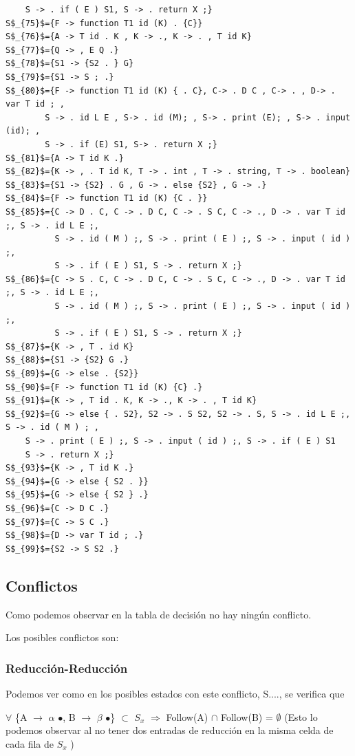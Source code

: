 \documentclass[a4paper, 12pt]{article}
\begin{document}
\begin{lstlisting}
	S -> . if ( E ) S1, S -> . return X ;}
S$_{75}$={F -> function T1 id (K) . {C}}
S$_{76}$={A -> T id . K , K -> ., K -> . , T id K}
S$_{77}$={Q -> , E Q .}
S$_{78}$={S1 -> {S2 . } G}
S$_{79}$={S1 -> S ; .}
S$_{80}$={F -> function T1 id (K) { . C}, C-> . D C , C-> . , D-> . var T id ; ,
        S -> . id L E , S-> . id (M); , S-> . print (E); , S-> . input (id); , 
        S -> . if (E) S1, S-> . return X ;}
S$_{81}$={A -> T id K .}
S$_{82}$={K -> , . T id K, T -> . int , T -> . string, T -> . boolean}
S$_{83}$={S1 -> {S2} . G , G -> . else {S2} , G -> .}
S$_{84}$={F -> function T1 id (K) {C . }}
S$_{85}$={C -> D . C, C -> . D C, C -> . S C, C -> ., D -> . var T id ;, S -> . id L E ;,
	      S -> . id ( M ) ;, S -> . print ( E ) ;, S -> . input ( id ) ;,
	      S -> . if ( E ) S1, S -> . return X ;}
S$_{86}$={C -> S . C, C -> . D C, C -> . S C, C -> ., D -> . var T id ;, S -> . id L E ;,
	      S -> . id ( M ) ;, S -> . print ( E ) ;, S -> . input ( id ) ;,
	      S -> . if ( E ) S1, S -> . return X ;}
S$_{87}$={K -> , T . id K}
S$_{88}$={S1 -> {S2} G .}
S$_{89}$={G -> else . {S2}}
S$_{90}$={F -> function T1 id (K) {C} .}
S$_{91}$={K -> , T id . K, K -> ., K -> . , T id K}
S$_{92}$={G -> else { . S2}, S2 -> . S S2, S2 -> . S, S -> . id L E ;, S -> . id ( M ) ; ,
	S -> . print ( E ) ;, S -> . input ( id ) ;, S -> . if ( E ) S1
	S -> . return X ;}
S$_{93}$={K -> , T id K .}  
S$_{94}$={G -> else { S2 . }}
S$_{95}$={G -> else { S2 } .}
S$_{96}$={C -> D C .}
S$_{97}$={C -> S C .}
S$_{98}$={D -> var T id ; .}
S$_{99}$={S2 -> S S2 .}
\end{lstlisting}

\subsection{Conflictos}
Como podemos observar en la tabla de decisión no hay ningún conflicto.

Los posibles conflictos son:
	\subsubsection*{Reducción-Reducción}
	Podemos ver como en los posibles estados con este conflicto, S...., se verifica que 
	
	$\forall$ \{A $\rightarrow$ $\alpha$ $\bullet$, B $\rightarrow$ $\beta$ $\bullet$\} $\subset$ $S_x$ $\Rightarrow$ Follow(A) $\cap$ Follow(B) = $\emptyset$ (Esto lo podemos observar al no tener dos entradas de reducción en la misma celda de cada fila de $S_x$ )
	
\end{document}
